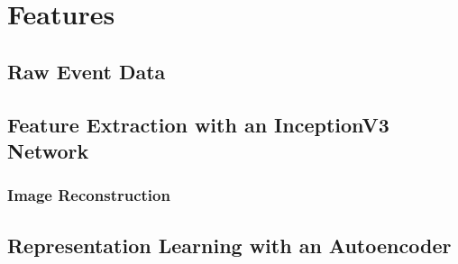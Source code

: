 \chapter{Features}
\label{cha:features}

\section{Raw Event Data}
\label{sec:raw-event-data}

\section{Feature Extraction with an InceptionV3 Network}
\label{sec:feat-extr-with}

\subsection{Image Reconstruction}
\label{sec:image-reconstruction}

\section{Representation Learning with an Autoencoder}
\label{sec:autoencoder}
